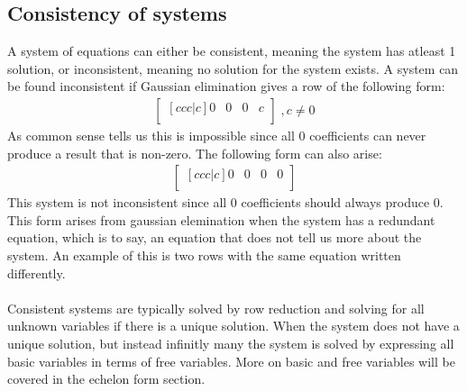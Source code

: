 \documentclass[11pt, a4paper]{article}
\begin{document}
\subsection{Consistency of systems}
A system of equations can either be consistent, meaning the system has atleast 1 solution, or 
inconsistent, meaning no solution for the system exists. A system can be found 
inconsistent if Gaussian elimination gives a row of the following form:
\begin{align*}
    \begin{bmatrix}[ccc|c]
        0 & 0 & 0 & c\\
    \end{bmatrix}
    \;, c \neq 0
\end{align*}
As common sense tells us this is impossible since all 0 coefficients can never produce
a result that is non-zero. The following form can also arise:
\begin{align*}
    \begin{bmatrix}[ccc|c]
        0 & 0 & 0 & 0\\
    \end{bmatrix}
\end{align*}
This system is not inconsistent since all 0 coefficients should always produce 0. This form arises from 
gaussian elemination when the system has a redundant equation, which is to say, an equation that does not
tell us more about the system. An example of this is two rows with the same equation written differently.\\
\\
Consistent systems are typically solved by row reduction and solving for all unknown variables if there is a unique
solution. When the system does not have a unique solution, but instead infinitly many the system is solved by expressing
all basic variables in terms of free variables. More on basic and free variables will be covered in the echelon form section.
\end{document}
